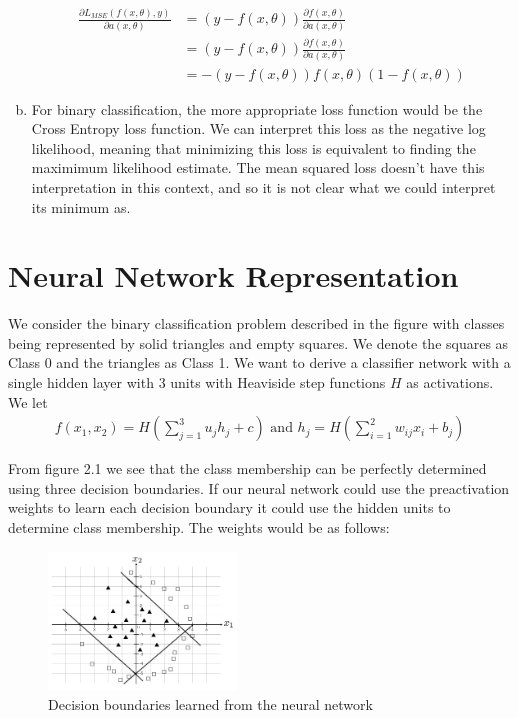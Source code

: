 \documentclass[paper=a4, fontsize=11pt]{scrartcl} %
\numberwithin{equation}{section} %
\numberwithin{figure}{section} %
\numberwithin{table}{section} %
\newcommand{\dP}[2]{\frac{\partial #1}{\partial #2}}
\begin{document}
\begin{enumerate}[(a)]
\begin{align*}
	\dP{L_{MSE}(f(x,\theta),y)}{a(x,\theta)} &= (y-f(x,\theta))\dP{f(x,\theta)}{a(x,\theta)}\\
	&= (y-f(x,\theta))\dP{f(x,\theta)}{a(x,\theta)}\\
	&= -(y-f(x,\theta))f(x, \theta)(1-f(x, \theta))
	\end{align*}
	\item For binary classification, the more appropriate loss function would be the Cross Entropy loss function. We can interpret this loss as the negative log likelihood, meaning that minimizing this loss is equivalent to finding the maximimum likelihood estimate. The mean squared loss doesn't have this interpretation in this context, and so it is not clear what we could interpret its minimum as.
\end{enumerate}

\section{Neural Network Representation}
We consider the binary classification problem described in the figure with
classes being represented by solid triangles and empty squares. We denote the squares as Class 0 and the triangles as Class 1. We want to derive a classifier network with a single hidden layer with 3 units with Heaviside step functions $H$ as activations. We let 
\begin{align*}
f(x_1, x_2) = H\left(\sum_{j=1}^3 u_j h_j + c\right) \text{ and } h_j = H\left(\sum_{i=1}^{2}w_{ij}x_i+b_j\right)
\end{align*}

From figure 2.1 we see that the class membership can be perfectly determined using three decision boundaries. If our neural network could use the preactivation weights to learn each decision boundary it could use the hidden units to determine class membership. The weights would be as follows:

\begin{figure}
	\begin{center}
		\includegraphics[width=50mm]{decisionregions.png}
	\end{center}
	\caption{Decision boundaries learned from the neural network}
\end{figure}
\end{document}
